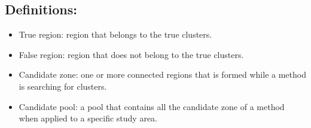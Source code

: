 \documentclass[12pt]{article}
\begin{document}
\subsection{Definitions:} 
\begin{itemize}
\item True region:  region that belongs to the true clusters. \\ 
\item False region:  region that does not belong to the true clusters. \\ 
\item Candidate zone:  one or more connected regions that is formed while a method is searching for clusters.\\ 
\item Candidate pool:  a pool that contains all the candidate zone of a method when applied to a specific study area. \\
\end{itemize}
\end{document}
